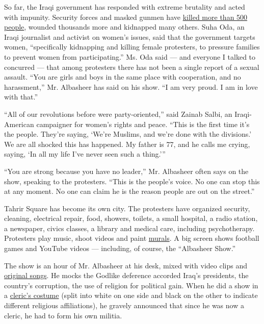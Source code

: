 So far, the Iraqi government has responded with extreme brutality and
acted with impunity. Security forces and masked gunmen have
\href{https://www.nytimes.com/2019/12/21/world/middleeast/Iraq-protests-Iran.html}{killed
more than 500 people}, wounded thousands more and kidnapped many others.
Suha Oda, an Iraqi journalist and activist on women's issues, said that
the government targets women, ``specifically kidnapping and killing
female protesters, to pressure families to prevent women from
participating.'' Ms. Oda said --- and everyone I talked to concurred ---
that among protesters there has not been a single report of a sexual
assault. ``You are girls and boys in the same place with cooperation,
and no harassment,'' Mr. Albasheer has said on his show. ``I am very
proud. I am in love with that.''

``All of our revolutions before were party-oriented,'' said Zainab
Salbi, an Iraqi-American campaigner for women's rights and peace. ``This
is the first time it's the people. They're saying, `We're Muslims, and
we're done with the divisions.' We are all shocked this has happened. My
father is 77, and he calls me crying, saying, `In all my life I've never
seen such a thing.'''

``You are strong because you have no leader,'' Mr. Albasheer often says
on the show, speaking to the protesters. ``This is the people's voice.
No one can stop this at any moment. No one can claim he is the reason
people are out on the street.''

Tahrir Square has become its own city. The protesters have organized
security, cleaning, electrical repair, food, showers, toilets, a small
hospital, a radio station, a newspaper, civics classes, a library and
medical care, including psychotherapy. Protesters play music, shoot
videos and paint
\href{https://www.theguardian.com/global-development/gallery/2019/nov/26/murals-of-baghdad-the-protest-art-in-pictures}{murals}.
A big screen shows football games and YouTube videos --- including, of
course, the ``Albasheer Show.''

The show is an hour of Mr. Albasheer at his desk, mixed with video clips
and
\href{https://www.youtube.com/watch?v=uXgT-hvf_1o\&feature=youtu.be}{original
songs}. He mocks the Godlike deference accorded Iraq's presidents, the
country's corruption, the use of religion for political gain. When he
did a show in a
\href{https://www.youtube.com/watch?v=RQ54rlGp4WM\&feature=youtu.be}{cleric's
costume} (split into white on one side and black on the other to
indicate different religious affiliations), he gravely announced that
since he was now a cleric, he had to form his own militia.

